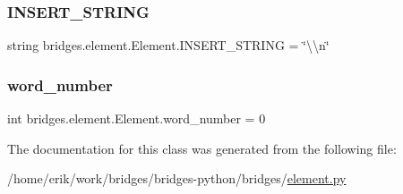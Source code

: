 \subsubsection{\texorpdfstring{I\+N\+S\+E\+R\+T\+\_\+\+S\+T\+R\+I\+NG}{INSERT\_STRING}}
{\footnotesize\ttfamily string bridges.\+element.\+Element.\+I\+N\+S\+E\+R\+T\+\_\+\+S\+T\+R\+I\+NG = \char`\"{}\textbackslash{}\textbackslash{}n\char`\"{}\hspace{0.3cm}{\ttfamily [static]}}

\mbox{\label{classbridges_1_1element_1_1_element_acd203dd3944abb6407aa37957b5f07ce}} 
\subsubsection{\texorpdfstring{word\+\_\+number}{word\_number}}
{\footnotesize\ttfamily int bridges.\+element.\+Element.\+word\+\_\+number = 0\hspace{0.3cm}{\ttfamily [static]}}



The documentation for this class was generated from the following file\+:\begin{DoxyCompactItemize}
\item 
/home/erik/work/bridges/bridges-\/python/bridges/\hyperlink{element_8py}{element.\+py}\end{DoxyCompactItemize}
